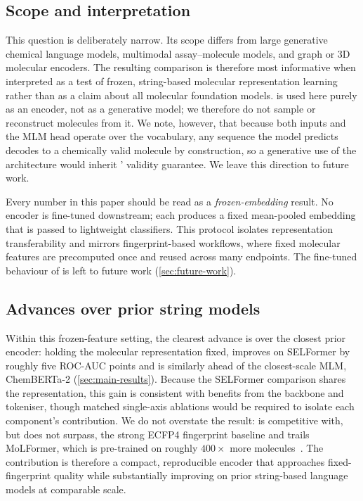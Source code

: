 \documentclass[11pt,a4paper]{article}
\begin{document}
\subsection{Scope and interpretation}
\label{sec:scope}

This question is deliberately narrow. Its scope differs from large generative
chemical language models, multimodal assay--molecule models, and graph or 3D
molecular encoders. The
resulting comparison is therefore most informative when interpreted as a test
of frozen, string-based molecular representation learning rather than as a
claim about all molecular foundation models. \model{} is used here purely as an
encoder, not as a generative model; we therefore do not sample or reconstruct
molecules from it. We note, however, that because both inputs and the MLM head
operate over the \selfies{} vocabulary, any \selfies{} sequence the model
predicts decodes to a chemically valid molecule by construction, so a
generative use of the architecture would inherit \selfies{}' validity guarantee.
We leave this direction to future work.

Every number in this paper should be read as a \emph{frozen-embedding}
result. No encoder is fine-tuned downstream; each produces a fixed mean-pooled
embedding that is passed to lightweight classifiers. This protocol isolates
representation transferability and mirrors fingerprint-based workflows, where
fixed molecular features are precomputed once and reused across many endpoints.
The fine-tuned behaviour of \model{} is left to future work
(\cref{sec:future-work}).

\subsection{Advances over prior string models}
\label{sec:advances}

Within this frozen-feature setting, the clearest advance is over the closest
prior \selfies{} encoder: holding the molecular representation fixed, \model{}
improves on SELFormer by roughly five ROC-AUC points and is similarly ahead of
the closest-scale \smiles{} MLM, ChemBERTa-2 (\cref{sec:main-results}). Because
the SELFormer comparison shares the \selfies{} representation, this gain is
consistent with benefits from the \modernbert{} backbone and \ape{} tokeniser,
though matched single-axis ablations would be required to isolate each
component's contribution. We do not overstate the result: \model{} is
competitive with, but does not surpass, the strong ECFP4 fingerprint baseline
and trails MoLFormer, which is pre-trained on roughly $400\times$ more
molecules~\citep{rossLargescaleChemicalLanguage2022}. The contribution is
therefore a compact, reproducible
\selfies{} encoder that approaches fixed-fingerprint quality while substantially
improving on prior string-based language models at comparable scale.
\end{document}

